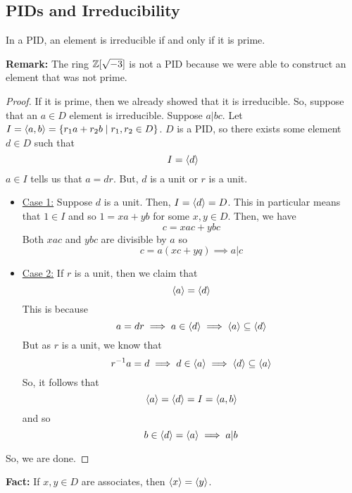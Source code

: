 \documentclass[letterpaper]{article}
\begin{document}
\subsection{PIDs and Irreducibility}
\begin{theorem}{}{}
    In a PID, an element is irreducible if and only if it is prime.
\end{theorem}
\textbf{Remark:} The ring $\mathbb{Z}[\sqrt{-3}]$ is not a PID because we were able to construct an element that was not prime. 
\begin{mdframed}[]
    \begin{proof}
        If it is prime, then we already showed that it is irreducible. So, suppose that an $a \in D$ element is irreducible. Suppose $a | bc$. Let $I = \langle a, b \rangle = \{r_1 a + r_2 b \mid r_1, r_2 \in D\}$. $D$ is a PID, so there exists some element $d \in D$ such that 
        \[I = \langle d \rangle\]
        $a \in I$ tells us that $a = dr$. But, $d$ is a unit or $r$ is a unit. 
        \begin{itemize}
            \item \underline{Case 1:} Suppose $d$ is a unit. Then, $I = \langle d \rangle = D$. This in particular means that $1 \in I$ and so $1 = xa + yb$ for some $x, y \in D$. Then, we have 
            \[c = xac + ybc\]
            Both $xac$ and $ybc$ are divisible by $a$ so 
            \[c = a(xc + yq) \implies a | c\]

            \item \underline{Case 2:} If $r$ is a unit, then we claim that 
            \[\langle a \rangle = \langle d \rangle\]
            This is because 
            \[a = dr \implies a \in \langle d \rangle \implies \langle a \rangle \subseteq \langle d \rangle\]
            But as $r$ is a unit, we know that 
            \[r^{-1}a = d \implies d \in \langle a \rangle \implies \langle d \rangle \subseteq \langle a \rangle\]
            So, it follows that 
            \[\langle a \rangle = \langle d \rangle = I = \langle a, b \rangle\]
            and so 
            \[b \in \langle d \rangle = \langle a \rangle \implies a | b\]
        \end{itemize}
        So, we are done. 
    \end{proof}
\end{mdframed}
\textbf{Fact:} If $x, y \in D$ are associates, then $\langle x \rangle = \langle y \rangle$. 
\end{document}
